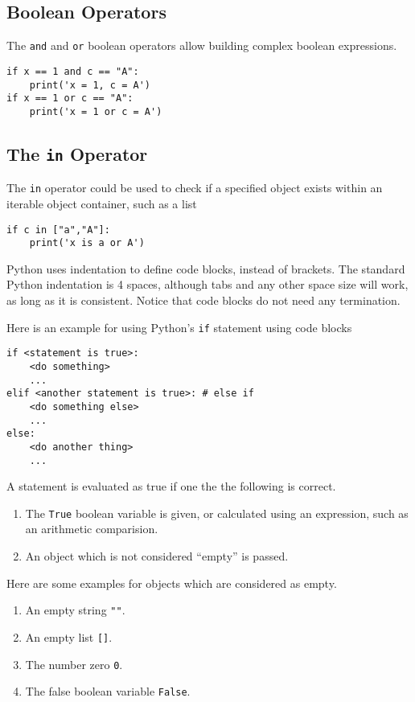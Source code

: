 \documentclass[a4paper,oneside]{book}
\numberwithin{equation}{chapter}
\begin{document}
\subsection{Boolean Operators}
The \texttt{and} and \texttt{or} boolean operators allow building complex boolean expressions.
\begin{verbatim}
if x == 1 and c == "A":
    print('x = 1, c = A')
if x == 1 or c == "A":
    print('x = 1 or c = A')
\end{verbatim}
\subsection{The \texttt{in} Operator}
The \texttt{in} operator could be used to check if a specified object exists within an iterable object container, such as a list
\begin{verbatim}
if c in ["a","A"]:
    print('x is a or A')
\end{verbatim}
Python uses indentation to define code blocks, instead of brackets. The standard Python indentation is 4 spaces, although tabs and any other space size will work, as long as it is consistent. Notice that code blocks do not need any termination.

Here is an example for using Python's \texttt{if} statement using code blocks
\begin{verbatim}
if <statement is true>:
    <do something>
    ...
elif <another statement is true>: # else if
    <do something else>
    ...
else:
    <do another thing>
    ...
\end{verbatim}

A statement is evaluated as true if one the the following is correct.
\begin{enumerate}
\item The \texttt{True} boolean variable is given, or calculated using an expression, such as an arithmetic comparision.
\item An object which is not considered ``empty'' is passed.
\end{enumerate}

Here are some examples for objects which are considered as empty.
\begin{enumerate}
\item An empty string \verb|""|.
\item An empty list \verb|[]|.
\item The number zero \verb|0|.
\item The false boolean variable \verb|False|.
\end{enumerate}
\end{document}
